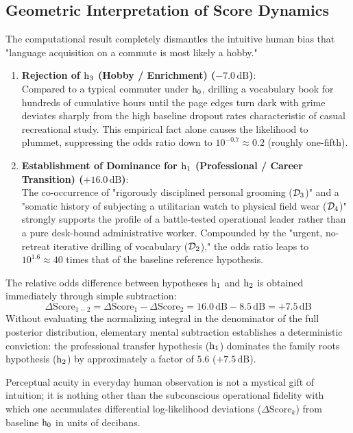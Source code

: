     \subsection{Geometric Interpretation of Score Dynamics}

    The computational result completely dismantles the intuitive human bias that "language acquisition on a commute is most likely a hobby."

    \begin{enumerate}
        \item \textbf{Rejection of $\mathrm{h}_3$ (Hobby / Enrichment) ($-7.0\,\text{dB}$)}: \\
            Compared to a typical commuter under $\mathrm{h}_0$, drilling a vocabulary book for hundreds of cumulative hours until the page edges turn dark with grime deviates sharply from the high baseline dropout rates characteristic of casual recreational study. This empirical fact alone causes the likelihood to plummet, suppressing the odds ratio down to $10^{-0.7} \approx 0.2$ (roughly one-fifth).

        \item \textbf{Establishment of Dominance for $\mathrm{h}_1$ (Professional / Career Transition) ($+16.0\,\text{dB}$)}: \\
            The co-occurrence of "rigorously disciplined personal grooming ($\mathcal{D}_3$)" and a "somatic history of subjecting a utilitarian watch to physical field wear ($\mathcal{D}_4$)" strongly supports the profile of a battle-tested operational leader rather than a pure desk-bound administrative worker. Compounded by the "urgent, no-retreat iterative drilling of vocabulary ($\mathcal{D}_2$)," the odds ratio leaps to $10^{1.6} \approx 40$ times that of the baseline reference hypothesis.
    \end{enumerate}

    The relative odds difference between hypotheses $\mathrm{h}_1$ and $\mathrm{h}_2$ is obtained immediately through simple subtraction:
    \begin{equation}
        \Delta \text{Score}_{1 - 2} = \Delta \text{Score}_1 - \Delta \text{Score}_2 = 16.0\,\text{dB} - 8.5\,\text{dB} = +7.5\,\text{dB}
    \end{equation}
    Without evaluating the normalizing integral in the denominator of the full posterior distribution, elementary mental subtraction establishes a deterministic conviction: the professional transfer hypothesis ($\mathrm{h}_1$) dominates the family roots hypothesis ($\mathrm{h}_2$) by approximately a factor of $5.6$ ($+7.5\,\text{dB}$).

    Perceptual acuity in everyday human observation is not a mystical gift of intuition; it is nothing other than the subconscious operational fidelity with which one accumulates differential log-likelihood deviations ($\Delta \text{Score}_k$) from baseline $\mathrm{h}_0$ in units of decibans.
\fi
